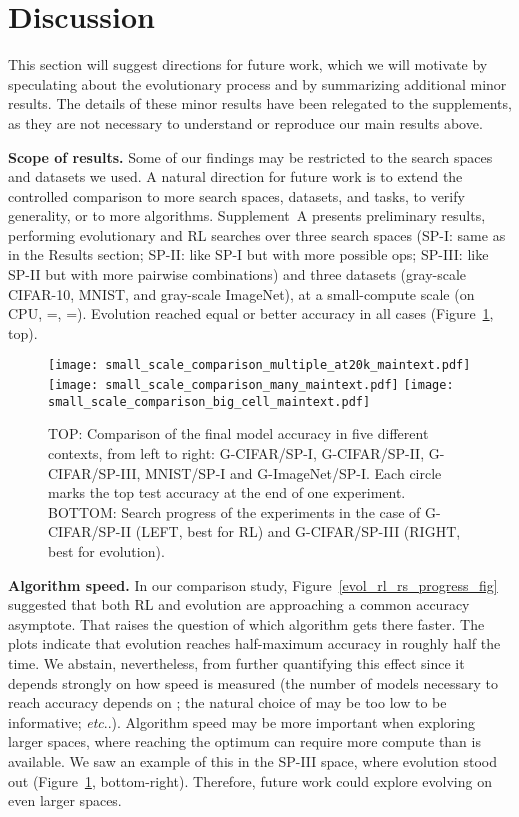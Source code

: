 \documentclass[letterpaper]{article} \usepackage{aaai19}  \usepackage{times}  \usepackage{helvet}  \usepackage{courier}  \usepackage{graphicx}  \frenchspacing
\makeatletter
\DeclareRobustCommand\onedot{\futurelet\@let@token\@onedot}
\def\@onedot{\ifx\@let@token.\else.\null\fi\xspace}
\def\etc{\emph{etc}\onedot}
\makeatother
\begin{document}
\section{Discussion}


This section will suggest directions for future work, which we will motivate by speculating about the evolutionary process and by summarizing additional minor results. The details of these minor results have been relegated to the supplements, as they are not necessary to understand or reproduce our main results above.

\textbf{Scope of results.} Some of our findings may be restricted to the search spaces and datasets we used. A natural direction for future work is to extend the controlled comparison to more search spaces, datasets, and tasks, to verify generality, or to more algorithms. Supplement~A presents preliminary results, performing evolutionary and RL searches over three search spaces (SP-I: same as in the Results section; SP-II: like SP-I but with more possible ops; SP-III: like SP-II but with more pairwise combinations) and three datasets (gray-scale CIFAR-10, MNIST, and gray-scale ImageNet), at a small-compute scale (on CPU, =, =). Evolution reached equal or better accuracy in all cases (Figure~\ref{evol_vs_rl_small_fig}, top).

\begin{figure}[ht]
\centering
\texttt{[image: small\_scale\_comparison\_multiple\_at20k\_maintext.pdf]}
\texttt{[image: small\_scale\_comparison\_many\_maintext.pdf]}
\texttt{[image: small\_scale\_comparison\_big\_cell\_maintext.pdf]}
\caption{TOP: Comparison of the final model accuracy in five different contexts, from left to right: G-CIFAR/SP-I, G-CIFAR/SP-II, G-CIFAR/SP-III, MNIST/SP-I and G-ImageNet/SP-I. Each circle marks the top test accuracy at the end of one experiment. BOTTOM: Search progress of the experiments in the case of G-CIFAR/SP-II (LEFT, best for RL) and G-CIFAR/SP-III (RIGHT, best for evolution).}
\label{evol_vs_rl_small_fig}
\end{figure}

\textbf{Algorithm speed.} In our comparison study, Figure~\ref{evol_rl_rs_progress_fig} suggested that both RL and evolution are approaching a common accuracy asymptote. That raises the question of which algorithm gets there faster. The plots indicate that evolution reaches half-maximum accuracy in roughly half the time. We abstain, nevertheless, from further quantifying this effect since it depends strongly on how speed is measured (the number of models necessary to reach accuracy  depends on ; the natural choice of  may be too low to be informative; \etc). Algorithm speed may be more important when exploring larger spaces, where reaching the optimum can require more compute than is available. We saw an example of this in the SP-III space, where evolution stood out (Figure~\ref{evol_vs_rl_small_fig}, bottom-right). Therefore, future work could explore evolving on even larger spaces.
\end{document}
